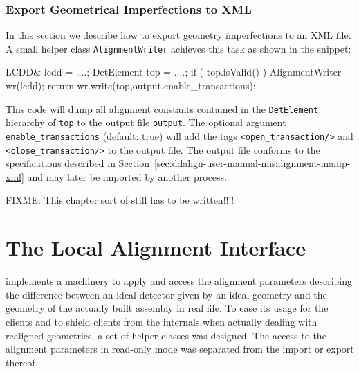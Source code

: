 \documentclass[10pt,a4paper]{article}
\begin{document}
\subsubsection{Export Geometrical Imperfections to XML}
\label{sec:ddalign-user-misalignment-expotr-xml}
\noindent
In this section we describe how to export geometry imperfections to an XML file.
A small helper class {\tt AlignmentWriter} achieves this task as shown in 
the snippet:
\begin{code}
  LCDD& lcdd = ....;
  DetElement top = ....;
  if ( top.isValid() )   {
    AlignmentWriter wr(lcdd);
    return wr.write(top,output,enable\_transactions);
  }
\end{code}
This code will dump all alignment constants contained in the {\tt DetElement}
hierarchy of {\tt top} to the output file {\tt output}. The optional argument
{\tt enable\_transactions} (default: true) will add the tags 
{\tt <open\_transaction/>} and {\tt <close\_transaction/>} to the output 
file. The output file conforms to the specifications described in 
Section~\ref{sec:ddalign-user-manual-misalignment-manip-xml} and may later
be imported by another process.




\vspace{3cm}
\noindent
FIXME: This chapter sort of still has to be written!!!!

\vspace{3cm}

\newpage
\section{The Local Alignment Interface}
\label{sec:ddalign-user-manual-ddalign-interface}

\noindent
\DDA implements a machinery to apply and access the alignment parameters
describing the difference between an ideal detector given by an ideal geometry
and the geometry of the actually built assembly in real life.
To ease its usage for the clients and to shield clients from the 
internals when actually dealing with realigned geometries, a set of 
helper classes was designed. The access to the alignment parameters 
in read-only mode was separated from the import or export thereof.
\end{document}
